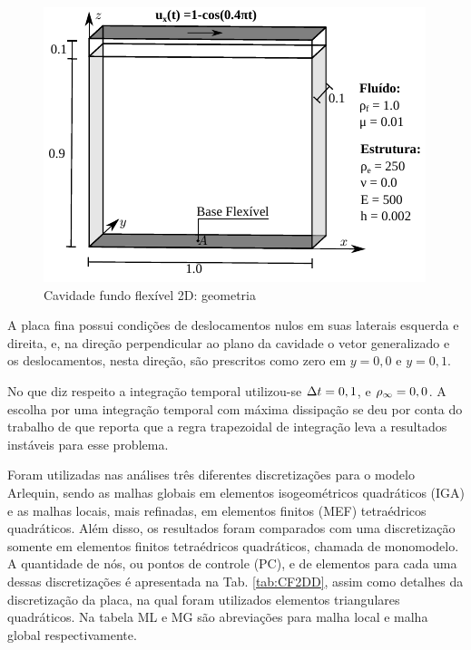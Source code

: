 \documentclass[tese_patricia]{subfiles}
\begin{document}
\begin{figure}[htb!]
	\centering 
	\includegraphics[scale=1.3,trim=0cm 0cm 0cm 0cm, clip=true]{Imagens/Cap7/cav2d.pdf}	
	\caption{Cavidade fundo flexível 2D: geometria}
	\label{fig:cavidadeFF2d:Geo}
\end{figure}

A placa fina possui condições de deslocamentos nulos em suas laterais esquerda e direita, e, na direção perpendicular ao plano da cavidade o vetor generalizado e os deslocamentos, nesta direção, são prescritos como zero em $y=0,0$ e $y=0,1$.

No que diz respeito a integração temporal utilizou-se $\Delta t = 0,1$, e $\rho_\infty = 0,0$. A escolha por uma integração temporal com máxima dissipação se deu por conta do trabalho de  que reporta que a regra trapezoidal de integração leva a resultados instáveis para esse problema.

Foram utilizadas nas análises três diferentes discretizações para o modelo Arlequin, sendo as malhas globais em elementos isogeométricos quadráticos (IGA) e as malhas locais, mais refinadas, em elementos finitos (MEF) tetraédricos quadráticos. Além disso, os resultados foram comparados com uma discretização somente em elementos finitos tetraédricos quadráticos, chamada de monomodelo. A quantidade de nós, ou pontos de controle (PC), e de elementos para cada uma dessas discretizações é apresentada na Tab. \ref{tab:CF2DD}, assim como detalhes da discretização da placa, na qual foram utilizados elementos triangulares quadráticos. Na tabela ML e MG são abreviações para malha local e malha global respectivamente.
	
\end{document}
